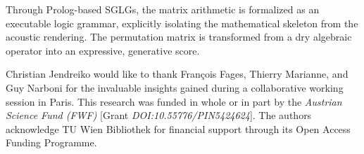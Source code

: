 \documentclass[
  twocolumn,
  aps,
  pra,
  showkeys,
  amsmath,amssymb,
  longbibliography
]{revtex4-2}
\begin{document}
Through Prolog-based SGLGs, the matrix arithmetic is
formalized as an executable logic grammar, explicitly isolating
the mathematical skeleton from the acoustic rendering.
The permutation matrix is transformed from a dry algebraic
operator into an expressive, generative score.

\begin{acknowledgments}
Christian Jendreiko would like to thank Fran\c{c}ois Fages,
Thierry Marianne, and Guy Narboni for the invaluable insights
gained during a collaborative working session in Paris.
This research was funded in whole or in part by the
\textit{Austrian Science Fund (FWF)}
[Grant \textit{DOI:10.55776/PIN5424624}].
The authors acknowledge TU Wien Bibliothek for financial
support through its Open Access Funding Programme.
\end{acknowledgments}
\end{document}
